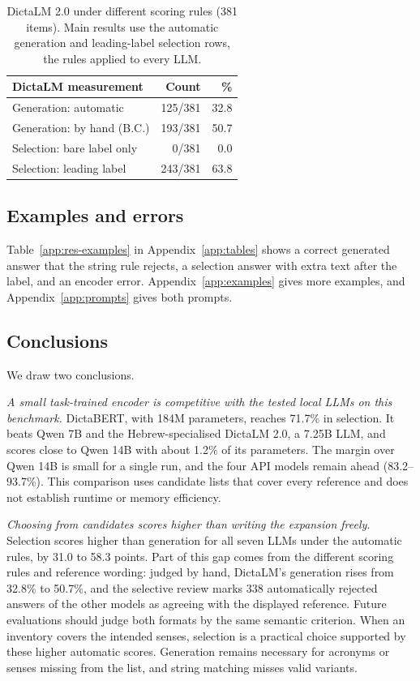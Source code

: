 \begin{table}[H]
\centering\small
\begin{tabular}{@{}lrr@{}}
\toprule
DictaLM measurement & Count & \% \\
\midrule
Generation: automatic & 125/381 & 32.8 \\
Generation: by hand (B.C.) & 193/381 & 50.7 \\
Selection: bare label only & 0/381 & 0.0 \\
Selection: leading label & 243/381 & 63.8 \\
\bottomrule
\end{tabular}
\caption{DictaLM 2.0 under different scoring rules (381 items). Main results use the automatic generation and leading-label selection rows, the rules applied to every LLM.}
\label{tab:dictalm-supplement}
\end{table}

\subsection{Examples and errors}
\label{sec:res-errors}
Table~\ref{app:res-examples} in Appendix~\ref{app:tables} shows a correct generated answer that the string rule rejects, a selection answer with extra text after the label, and an encoder error. Appendix~\ref{app:examples} gives more examples, and Appendix~\ref{app:prompts} gives both prompts.

\subsection{Conclusions}
\label{sec:conclusions}
We draw two conclusions.

\emph{A small task-trained encoder is competitive with the tested local LLMs on this benchmark.} DictaBERT, with 184M parameters, reaches 71.7\% in selection. It beats Qwen 7B and the Hebrew-specialised DictaLM 2.0, a 7.25B LLM, and scores close to Qwen 14B with about 1.2\% of its parameters. The margin over Qwen 14B is small for a single run, and the four API models remain ahead (83.2--93.7\%). This comparison uses candidate lists that cover every reference and does not establish runtime or memory efficiency.

\emph{Choosing from candidates scores higher than writing the expansion freely.} Selection scores higher than generation for all seven LLMs under the automatic rules, by 31.0 to 58.3 points. Part of this gap comes from the different scoring rules and reference wording: judged by hand, DictaLM's generation rises from 32.8\% to 50.7\%, and the selective review marks 338 automatically rejected answers of the other models as agreeing with the displayed reference. Future evaluations should judge both formats by the same semantic criterion. When an inventory covers the intended senses, selection is a practical choice supported by these higher automatic scores. Generation remains necessary for acronyms or senses missing from the list, and string matching misses valid variants.

